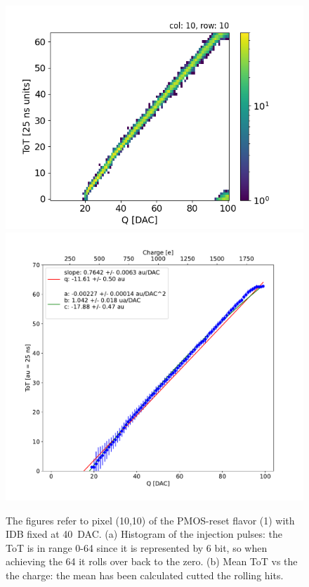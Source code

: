         \begin{figure}[h!]
            \centering
            \includegraphics[width=.49\linewidth]{figures/charaterization/ToT_rollover.png}            
            \includegraphics[width=.49\linewidth]{figures/charaterization/ToT_injection.pdf}
            \label{fig:ToT_vs_charge}
            \caption{The figures refer to pixel (10,10) of the PMOS-reset flavor (1) with IDB fixed at \SI{40}{DAC}. (a) Histogram of the injection pulses: the ToT is in range 0-64 since it is represented by 6 bit, so when achieving the 64 it rolls over back to the zero. (b) Mean ToT vs the the charge: the mean has been calculated cutted the rolling hits. }
        \end{figure}    

